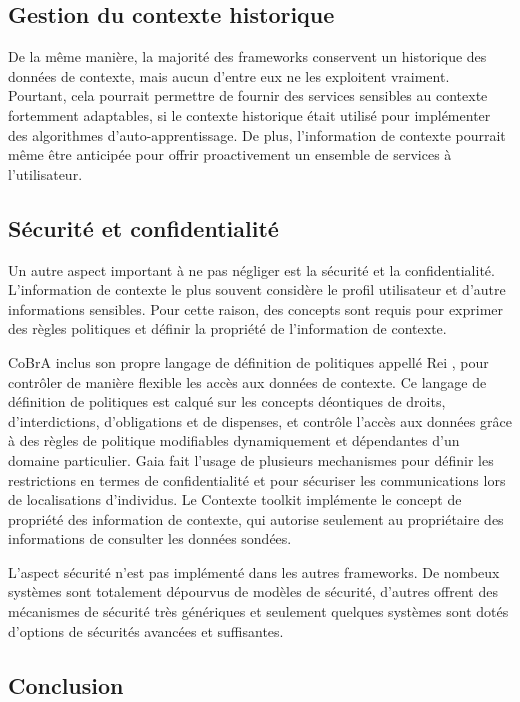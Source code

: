 \subsection{Gestion du contexte historique}

De la même manière, la majorité des frameworks conservent un historique des
données de contexte, mais aucun d'entre eux ne les exploitent vraiment.
Pourtant, cela pourrait permettre de fournir des services sensibles au contexte
fortemment adaptables, si le contexte historique était utilisé pour implémenter
des algorithmes d'auto-apprentissage. De plus, l'information de contexte
pourrait même être anticipée pour offrir proactivement un ensemble de services à
l'utilisateur.

\subsection{Sécurité et confidentialité}

Un autre aspect important à ne pas négliger est la sécurité et la
confidentialité. L'information de contexte le plus souvent considère le profil
utilisateur et d'autre informations sensibles. Pour cette raison, des concepts
sont requis pour exprimer des règles politiques et définir la propriété de
l'information de contexte. 

CoBrA inclus son propre langage de définition de politiques appellé Rei
\cite{kagal_policy_2005}, pour contrôler de manière flexible les accès aux
données de contexte. Ce langage de définition de politiques est calqué sur les
concepts déontiques de droits, d'interdictions, d'obligations et de dispenses,
et contrôle l'accès aux données grâce à des règles de politique modifiables
dynamiquement et dépendantes d'un domaine particulier. Gaia fait l'usage de
plusieurs mechanismes pour définir les restrictions en termes de confidentialité
et pour sécuriser les communications lors de localisations d'individus. Le
Contexte toolkit implémente le concept de propriété des information de contexte,
qui autorise seulement au propriétaire des informations de consulter les données
sondées.

L'aspect sécurité n'est pas implémenté dans les autres frameworks. De nombeux
systèmes sont totalement dépourvus de modèles de sécurité, d'autres offrent des
mécanismes de sécurité très génériques et seulement quelques systèmes sont dotés
d'options de sécurités avancées et suffisantes.

\subsection{Conclusion}

